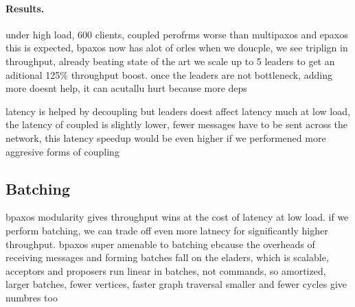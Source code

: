 \paragraph{Results.}
under high load, 600 clients, coupled perofrms worse than multipaxos and epaxos
this is expected, bpaxos now has alot of orles
when we doucple, we see triplign in throughput, already beating state of the art
we scale up to 5 leaders to get an aditional 125\% throughput boost. once the leaders are not bottleneck, adding more doesnt help, it can acutallu hurt because more deps

latency is helped by decoupling but leaders doest affect latency much
at low load, the latency of coupled is slightly lower, fewer messages have to be sent across the network, this latency speedup would be even higher if we performened more aggresive forms of coupling

\subsection{Batching}
bpaxos modularity gives throughput wins at the cost of latency at low load. if we perform batching, we can trade off even more latnecy for significantly higher throughput. bpaxos super amenable to batching ebcause the overheads of receiving messages and forming batches fall on the eladers, which is scalable, acceptors and proposers run linear in batches, not commands, so amortized, larger batches, fewer vertices, faster graph traversal smaller and fewer cycles
give numbres too
